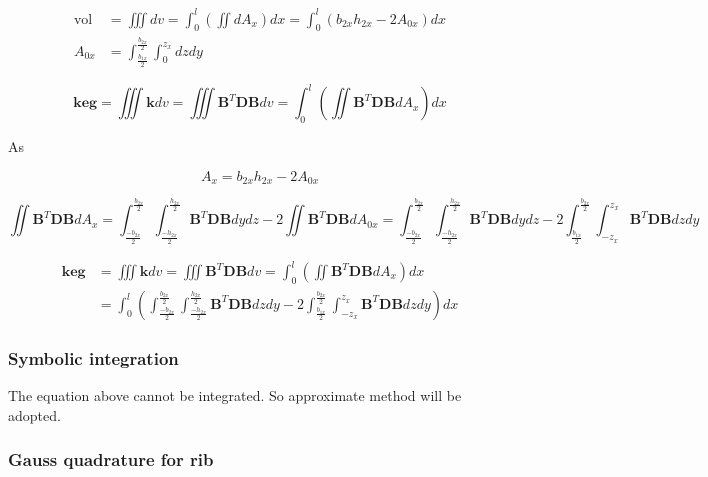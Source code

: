 \begin{align*}
\mathrm{vol} &= \iiint dv = \int _0^l \left( \iint dA_x \right) dx = \int _0^l \left( b_{2x} h_{2x} - 2 A_{0x} \right)dx \\
A_{0x} &= \int _\frac{b_{1x}}{2}^\frac{b_{2x}}{2} \int _0^{z_x} dzdy
\end{align*}

\begin{equation*}
\mathbf{keg} = \iiint \mathbf{k} dv = \iiint \mathbf{B}^T \mathbf{D} \mathbf{B} dv = \int_0^l \left(  \iint \mathbf{B}^T \mathbf{D} \mathbf{B} dA_x \right) dx
\end{equation*}

As 

\begin{equation*}
A_x =  b_{2x} h_{2x} - 2 A_{0x}
\end{equation*}

\begin{equation*}
\iint \mathbf{B}^T \mathbf{D} \mathbf{B} dA_x = \int _\frac{-b_{2x}}{2}^\frac{b_{2x}}{2} \int _\frac{-h_{2x}}{2}^\frac{h_{2x}}{2} \mathbf{B}^T \mathbf{D} \mathbf{B} dydz - 2 \iint \mathbf{B}^T \mathbf{D} \mathbf{B} dA_{0x} = \int _\frac{-b_{2x}}{2}^\frac{b_{2x}}{2} \int _\frac{-h_{2x}}{2}^\frac{h_{2x}}{2} \mathbf{B}^T \mathbf{D} \mathbf{B} dydz - 2 \int _\frac{b_{1x}}{2}^\frac{b_{2x}}{2} \int _{-z_x}^{z_x} \mathbf{B}^T \mathbf{D} \mathbf{B} dz dy
\end{equation*}

\begin{align*}
\mathbf{keg} &= \iiint \mathbf{k} dv = \iiint \mathbf{B}^T \mathbf{D} \mathbf{B} dv = \int_0^l \left(  \iint \mathbf{B}^T \mathbf{D} \mathbf{B} dA_x \right) dx \\
&= \int_0^l \left( \int _\frac{-b_{2x}}{2}^\frac{b_{2x}}{2} \int _\frac{-h_{2x}}{2}^\frac{h_{2x}}{2} \mathbf{B}^T \mathbf{D} \mathbf{B} dzdy - 2  \int _\frac{b_{1x}}{2}^\frac{b_{2x}}{2} \int _{-z_x}^{z_x} \mathbf{B}^T \mathbf{D} \mathbf{B} dz dy \right) dx
\end{align*}

\subsubsection{Symbolic integration}
The equation above cannot be integrated. So approximate method will be adopted.

\subsubsection{Gauss quadrature for rib}


